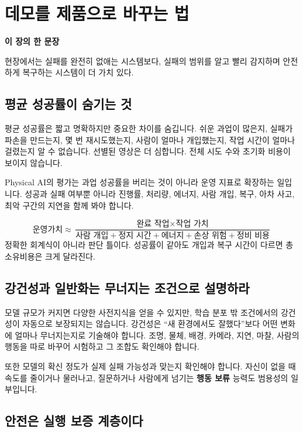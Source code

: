 \documentclass[11pt,openany]{book}
\newcommand{\keyterm}[1]{{\sffamily\bfseries\color{deepblue}#1}}
\newcommand{\chaptertakeaway}[1]{%
  \begin{tcolorbox}[
    breakable,
    colback=deepblue,
    colframe=deepblue,
    coltext=white,
    boxrule=0pt,
    arc=2mm,
    left=5mm,right=5mm,top=4mm,bottom=4mm
  ]
  {\sffamily\bfseries\large 이 장의 한 문장}\par\smallskip
  #1
  \end{tcolorbox}
}
\begin{document}
\chapter{데모를 제품으로 바꾸는 법}
\chaptertakeaway{현장에서는 실패를 완전히 없애는 시스템보다, 실패의 범위를 알고 빨리 감지하며 안전하게 복구하는 시스템이 더 가치 있다.}

\section{평균 성공률이 숨기는 것}

평균 성공률은 짧고 명확하지만 중요한 차이를 숨깁니다. 쉬운 과업이 많은지, 실패가 파손을 만드는지, 몇 번 재시도했는지, 사람이 얼마나 개입했는지, 작업 시간이 얼마나 걸렸는지 알 수 없습니다. 선별된 영상은 더 심합니다. 전체 시도 수와 초기화 비용이 보이지 않습니다.

Physical AI의 평가는 과업 성공률을 버리는 것이 아니라 운영 지표로 확장하는 일입니다. 성공과 실패 여부뿐 아니라 진행률, 처리량, 에너지, 사람 개입, 복구, 아차 사고, 최악 구간의 지연을 함께 봐야 합니다.

\begin{boardbox}
\[
\text{운영가치}
\approx
\frac{
\text{완료 작업}\times\text{작업 가치}
}{
\text{사람 개입}+\text{정지 시간}+\text{에너지}+\text{손상 위험}+\text{정비 비용}
}
\]
\small
정확한 회계식이 아니라 판단 틀이다. 성공률이 같아도 개입과 복구 시간이 다르면 총소유비용은 크게 달라진다.
\end{boardbox}

\section{강건성과 일반화는 무너지는 조건으로 설명하라}

모델 규모가 커지면 다양한 사전지식을 얻을 수 있지만, 학습 분포 밖 조건에서의 강건성이 자동으로 보장되지는 않습니다. 강건성은 ``새 환경에서도 잘했다''보다 어떤 변화에 얼마나 무너지는지로 기술해야 합니다. 조명, 물체, 배경, 카메라, 지연, 마찰, 사람의 행동을 따로 바꾸어 시험하고 그 조합도 확인해야 합니다.

또한 모델의 확신 정도가 실제 실패 가능성과 맞는지 확인해야 합니다. 자신이 없을 때 속도를 줄이거나 물러나고, 질문하거나 사람에게 넘기는 \keyterm{행동 보류} 능력도 범용성의 일부입니다.

\section{안전은 실행 보증 계층이다}
\end{document}
